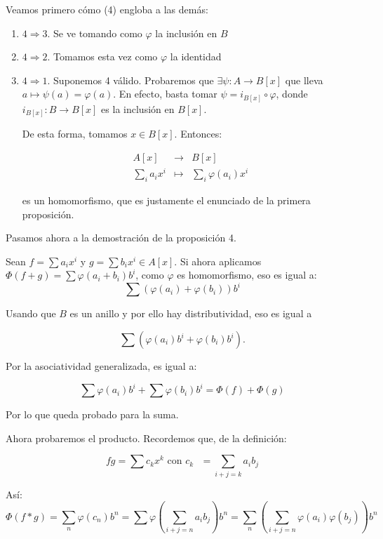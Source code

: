 \documentclass[11pt, a4paper, titlepage]{article}
\makeatletter
\newif\IfInSansMode
\let\oldsf\sffamily
\renewcommand*{\sffamily}{\oldsf\mathversion{sans}\InSansModetrue}
\let\oldnorm\normalfont
\renewcommand*{\normalfont}{\oldnorm\InSansModefalse\mathversion{normal}}
\renewenvironment{proof}[1][\proofname] {\vspace{-15pt}\par\pushQED{\qed}\normalfont\topsep6\p@\@plus6\p@\relax\trivlist\item[\hskip\labelsep\it#1\@addpunct{.}]\ignorespaces}{\popQED\endtrivlist\@endpefalse}
\renewenvironment{proof}[1][\proofname] {\par\pushQED{\qed}\normalfont\topsep6\p@\@plus6\p@\relax\trivlist\item[\hskip\labelsep\itshape\sffamily#1\@addpunct{.}]\ignorespaces}{\popQED\endtrivlist\@endpefalse}
\theoremstyle{theorem-style}
\theoremstyle{definition-style}
\theoremstyle{remark-style}
\theoremstyle{example-style}
\newenvironment{nlist}
{\begin{enumerate}
\renewcommand\labelenumi{(\emph{\roman{enumi})}}}
{\end{enumerate}}
\makeatother
\begin{document}
\begin{proof}
Veamos primero cómo (4) engloba a las demás:
\begin{nlist}

\item $4 \Rightarrow 3$. Se ve tomando como $\varphi$ la inclusión en $B$
\item $4 \Rightarrow 2$. Tomamos esta vez como $\varphi$ la identidad
\item $4 \Rightarrow 1$. Suponemos 4 válido. Probaremos que $\exists\psi: A \to B[x]$ que lleva $a \mapsto \psi(a) = \varphi(a)$.
  En efecto, basta tomar $\psi = i_{B[x]} \circ \varphi$, donde $i_{B[x]} : B \to B[x]$ es la inclusión en $B[x]$.


De esta forma, tomamos $x\in B[x]$. Entonces:

\[
\begin{array}{lll}

  A[x] & \to & B[x] \\
  \sum_i a_i x^i & \mapsto & \sum_i \varphi(a_i)x^i
\end{array}
\]

es un homomorfismo, que es justamente el enunciado de la primera proposición.

\end{nlist}

Pasamos ahora a la demostración de la proposición 4.


Sean $f = \sum a_i x^i$ y $g = \sum b_i x^i \in A[x]$.
Si ahora aplicamos $\Phi(f+g) = \sum \varphi(a_i + b_i)b^i$, como $\varphi$ es homomorfismo, eso es igual a:
\[
    \sum (\varphi(a_i) + \varphi(b_i))b^i
\]

Usando que $B$ es un anillo y por ello hay distributividad, eso es igual a

\[
    \sum (\varphi(a_i)b^i + \varphi(b_i)b^i).
\]

Por la asociatividad generalizada, es igual a:

\[
\sum \varphi(a_i)b^i + \sum \varphi(b_i)b^i = \Phi(f) + \Phi(g)
\]

Por lo que queda probado para la suma.

Ahora probaremos el producto. Recordemos que, de la definición:

\[
fg = \sum c_k x^k \text{ con $c_k$ }  = \sum_{i+j = k} a_ib_j
\]

 Así: \[\Phi(f*g) = \sum_n\varphi(c_n)b^n = \sum \varphi\left(\sum_{i+j = n} a_ib_j\right)b^n = \sum_n \left( \sum_{i+j = n} \varphi(a_i)\varphi(b_j)\right)b^n\]


\end{proof}
\end{document}
